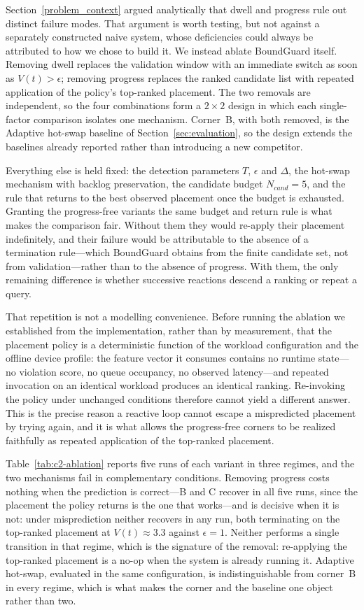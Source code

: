 \documentclass[conference]{IEEEtran}
\begin{document}
{{\color{navyblue}%
Section~\ref{problem_context} argued analytically that dwell and progress rule out distinct failure modes. That argument is worth testing, but not against a separately constructed naive system, whose deficiencies could always be attributed to how we chose to build it. We instead ablate BoundGuard itself. Removing dwell replaces the validation window with an immediate switch as soon as $V(t)>\epsilon$; removing progress replaces the ranked candidate list with repeated application of the policy's top-ranked placement. The two removals are independent, so the four combinations form a $2\times2$ design in which each single-factor comparison isolates one mechanism. Corner~B, with both removed, is the Adaptive hot-swap baseline of Section~\ref{sec:evaluation}, so the design extends the baselines already reported rather than introducing a new competitor.

Everything else is held fixed: the detection parameters $T$, $\epsilon$ and $\Delta$, the hot-swap mechanism with backlog preservation, the candidate budget $N_{cand}=5$, and the rule that returns to the best observed placement once the budget is exhausted. Granting the progress-free variants the same budget and return rule is what makes the comparison fair. Without them they would re-apply their placement indefinitely, and their failure would be attributable to the absence of a termination rule---which BoundGuard obtains from the finite candidate set, not from validation---rather than to the absence of progress. With them, the only remaining difference is whether successive reactions descend a ranking or repeat a query.

That repetition is not a modelling convenience. Before running the ablation we established from the implementation, rather than by measurement, that the placement policy is a deterministic function of the workload configuration and the offline device profile: the feature vector it consumes contains no runtime state---no violation score, no queue occupancy, no observed latency---and repeated invocation on an identical workload produces an identical ranking. Re-invoking the policy under unchanged conditions therefore cannot yield a different answer. This is the precise reason a reactive loop cannot escape a mispredicted placement by trying again, and it is what allows the progress-free corners to be realized faithfully as repeated application of the top-ranked placement.

Table~\ref{tab:c2-ablation} reports five runs of each variant in three regimes, and the two mechanisms fail in complementary conditions. Removing progress costs nothing when the prediction is correct---B and C recover in all five runs, since the placement the policy returns is the one that works---and is decisive when it is not: under misprediction neither recovers in any run, both terminating on the top-ranked placement at $V(t)\approx3.3$ against $\epsilon=1$. Neither performs a single transition in that regime, which is the signature of the removal: re-applying the top-ranked placement is a no-op when the system is already running it. Adaptive hot-swap, evaluated in the same configuration, is indistinguishable from corner~B in every regime, which is what makes the corner and the baseline one object rather than two.

}}
\end{document}

